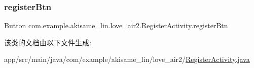 \subsubsection{\texorpdfstring{registerBtn}{registerBtn}}
{\footnotesize\ttfamily Button com.\+example.\+akisame\+\_\+lin.\+love\+\_\+air2.\+Register\+Activity.\+register\+Btn\hspace{0.3cm}{\ttfamily [private]}}



该类的文档由以下文件生成\+:\begin{DoxyCompactItemize}
\item 
app/src/main/java/com/example/akisame\+\_\+lin/love\+\_\+air2/\mbox{\hyperlink{_register_activity_8java}{Register\+Activity.\+java}}\end{DoxyCompactItemize}
